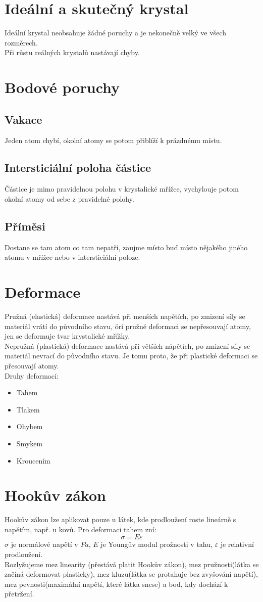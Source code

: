 \documentclass[titlepage]{report}
\begin{document}
\section{Ideální a skutečný krystal}
Ideální krystal neobsahuje žádné poruchy a je nekonečně velký ve všech rozměrech.\\
Při růstu reálných krystalů nastávají chyby.
\section{Bodové poruchy}
\subsection{Vakace}
Jeden atom chybí, okolní atomy se potom přiblíží k prázdnému místu.
\subsection{Intersticiální poloha částice}
Částice je mimo pravidelnou polohu v krystalické mřížce, vychylouje potom okolní atomy od sebe z pravidelné polohy.
\subsection{Příměsi}
Dostane se tam atom co tam nepatří, zaujme místo buď místo nějakého jiného atomu v mřížce nebo v intersticiální poloze.
\section{Deformace}
Pružná (elastická) deformace nastává při menších napětích, po zmizení síly se materiál vrátí do původního stavu, öri pružné deformaci se nepřesouvají atomy, jen se deformuje tvar krystalické mřížky.\\
Nepružná (plastická) deformace nastává při větších nápětích, po zmizení síly se materiál nevrací do původního stavu. Je tomu proto, že při plastické deformaci se přesouvají atomy.\\
Druhy deformací:\\
\begin{itemize}
\item Tahem
\item Tlakem
\item Ohybem
\item Smykem
\item Kroucením
\end{itemize}
\section{Hookův zákon}
Hookův zákon lze aplikovat pouze u látek, kde prodloužení roste lineárně s napětím, např. u kovů. Pro deformaci tahem zní:\\
\begin{equation}
\sigma = E \varepsilon
\end{equation}
$\sigma$ je normálové napětí v $Pa$, $E$ je Youngův modul prožnosti v tahu, $\varepsilon$ je relativní prodloužení.\\
Rozlyšujeme mez linearity (přestává platit Hookův zákon), mez pružnosti(látka se začíná deformovat plasticky), mez kluzu(látka se protahuje bez zvyšování napětí), mez pevnosti(maximální napětí, které látka snese) a bod, kdy dochází k přetržení.
\end{document}
